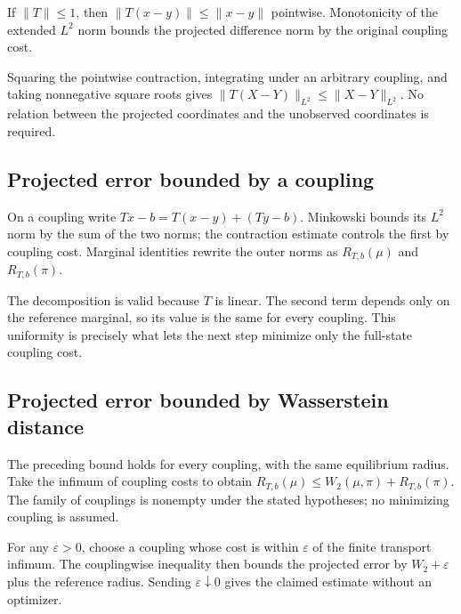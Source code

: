 \documentclass[11pt,a4paper]{report}
\begin{document}
If \(\|T\|\le1\), then \(\|T(x-y)\|\le\|x-y\|\) pointwise. Monotonicity of the extended \(L^2\) norm bounds the projected difference norm by the original coupling cost.



Squaring the pointwise contraction, integrating under an arbitrary coupling, and taking nonnegative square roots gives \(\|T(X-Y)\|_{L^2}\le\|X-Y\|_{L^2}\). No relation between the projected coordinates and the unobserved coordinates is required.

\subsection{\texorpdfstring{Projected error bounded by a coupling}{Projected error bounded by a coupling}}
\label{report-step-UnadjustedLangevin-Projection-lean-4}


On a coupling write \(Tx-b=T(x-y)+(Ty-b)\). Minkowski bounds its \(L^2\) norm by the sum of the two norms; the contraction estimate controls the first by coupling cost. Marginal identities rewrite the outer norms as \(R_{T,b}(\mu)\) and \(R_{T,b}(\pi)\).



The decomposition is valid because \(T\) is linear. The second term depends only on the reference marginal, so its value is the same for every coupling. This uniformity is precisely what lets the next step minimize only the full-state coupling cost.

\subsection{\texorpdfstring{Projected error bounded by Wasserstein distance}{Projected error bounded by Wasserstein distance}}
\label{report-step-UnadjustedLangevin-Projection-lean-5}


The preceding bound holds for every coupling, with the same equilibrium radius. Take the infimum of coupling costs to obtain \(R_{T,b}(\mu)\le W_2(\mu,\pi)+R_{T,b}(\pi)\). The family of couplings is nonempty under the stated hypotheses; no minimizing coupling is assumed.



For any \(\varepsilon>0\), choose a coupling whose cost is within \(\varepsilon\) of the finite transport infimum. The couplingwise inequality then bounds the projected error by \(W_2+\varepsilon\) plus the reference radius. Sending \(\varepsilon\downarrow0\) gives the claimed estimate without an optimizer.
\end{document}
